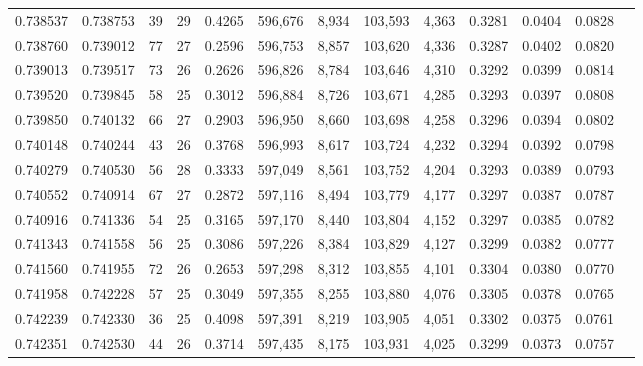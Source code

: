 \begin{tabular}{rrrrrrrrrrrrr}
0.738537 & 0.738753 &  39 &  29 &                                     0.4265 & 596,676 &   8,934 & 103,593 &   4,363 & 0.3281 & 0.0404 & 0.0828 \\
0.738760 & 0.739012 &  77 &  27 &                                     0.2596 & 596,753 &   8,857 & 103,620 &   4,336 & 0.3287 & 0.0402 & 0.0820 \\
0.739013 & 0.739517 &  73 &  26 &                                     0.2626 & 596,826 &   8,784 & 103,646 &   4,310 & 0.3292 & 0.0399 & 0.0814 \\
0.739520 & 0.739845 &  58 &  25 &                                     0.3012 & 596,884 &   8,726 & 103,671 &   4,285 & 0.3293 & 0.0397 & 0.0808 \\
0.739850 & 0.740132 &  66 &  27 &                                     0.2903 & 596,950 &   8,660 & 103,698 &   4,258 & 0.3296 & 0.0394 & 0.0802 \\
0.740148 & 0.740244 &  43 &  26 &                                     0.3768 & 596,993 &   8,617 & 103,724 &   4,232 & 0.3294 & 0.0392 & 0.0798 \\
0.740279 & 0.740530 &  56 &  28 &                                     0.3333 & 597,049 &   8,561 & 103,752 &   4,204 & 0.3293 & 0.0389 & 0.0793 \\
0.740552 & 0.740914 &  67 &  27 &                                     0.2872 & 597,116 &   8,494 & 103,779 &   4,177 & 0.3297 & 0.0387 & 0.0787 \\
0.740916 & 0.741336 &  54 &  25 &                                     0.3165 & 597,170 &   8,440 & 103,804 &   4,152 & 0.3297 & 0.0385 & 0.0782 \\
0.741343 & 0.741558 &  56 &  25 &                                     0.3086 & 597,226 &   8,384 & 103,829 &   4,127 & 0.3299 & 0.0382 & 0.0777 \\
0.741560 & 0.741955 &  72 &  26 &                                     0.2653 & 597,298 &   8,312 & 103,855 &   4,101 & 0.3304 & 0.0380 & 0.0770 \\
0.741958 & 0.742228 &  57 &  25 &                                     0.3049 & 597,355 &   8,255 & 103,880 &   4,076 & 0.3305 & 0.0378 & 0.0765 \\
0.742239 & 0.742330 &  36 &  25 &                                     0.4098 & 597,391 &   8,219 & 103,905 &   4,051 & 0.3302 & 0.0375 & 0.0761 \\
0.742351 & 0.742530 &  44 &  26 &                                     0.3714 & 597,435 &   8,175 & 103,931 &   4,025 & 0.3299 & 0.0373 & 0.0757 \\

\end{tabular}
